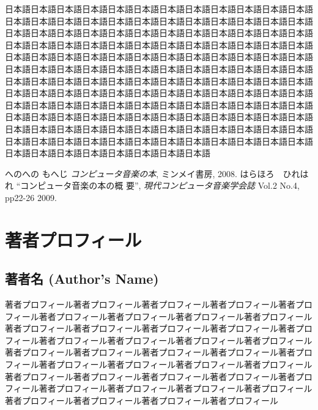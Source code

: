 \documentclass{jsarticle}
\begin{document}
日本語日本語日本語日本語日本語日本語日本語日本語日本語日本語日本語日本語
日本語日本語日本語日本語日本語日本語日本語日本語日本語日本語日本語日本語
日本語日本語日本語日本語日本語日本語日本語日本語日本語日本語日本語日本語
日本語日本語日本語日本語日本語日本語日本語日本語日本語日本語日本語日本語
日本語日本語日本語日本語日本語日本語日本語日本語日本語日本語日本語日本語
日本語日本語日本語日本語日本語日本語日本語日本語日本語日本語日本語日本語
日本語日本語日本語日本語日本語日本語日本語日本語日本語日本語日本語日本語
日本語日本語日本語日本語日本語日本語日本語日本語日本語日本語日本語日本語
日本語日本語日本語日本語日本語日本語日本語日本語日本語日本語日本語日本語
日本語日本語日本語日本語日本語日本語日本語日本語日本語日本語日本語日本語
日本語日本語日本語日本語日本語日本語日本語日本語日本語日本語日本語日本語
日本語日本語日本語日本語日本語日本語日本語日本語日本語日本語日本語日本語
日本語日本語日本語日本語日本語日本語日本語日本語




\begin{thebibliography}{citations}
 へのへの もへじ {\it コンピュータ音楽の本},
	ミンメイ書房, 2008.
 はらほろ　ひれはれ ``コンピュータ音楽の本の概
	要'', {\it 現代コンピュータ音楽学会誌} Vol.2 No.4, pp22-26
	2009.
\end{thebibliography}

\section{著者プロフィール}


\subsection*{著者名 (Author's Name)}

著者プロフィール著者プロフィール著者プロフィール著者プロフィール著者プロ
フィール著者プロフィール著者プロフィール著者プロフィール著者プロフィール
著者プロフィール著者プロフィール著者プロフィール著者プロフィール著者プロ
フィール著者プロフィール著者プロフィール著者プロフィール著者プロフィール
著者プロフィール著者プロフィール著者プロフィール著者プロフィール著者プロ
フィール著者プロフィール著者プロフィール著者プロフィール著者プロフィール
著者プロフィール著者プロフィール著者プロフィール著者プロフィール著者プロ
フィール著者プロフィール著者プロフィール著者プロフィール著者プロフィール
著者プロフィール著者プロフィール著者プロフィール著者プロフィール
\end{document}
